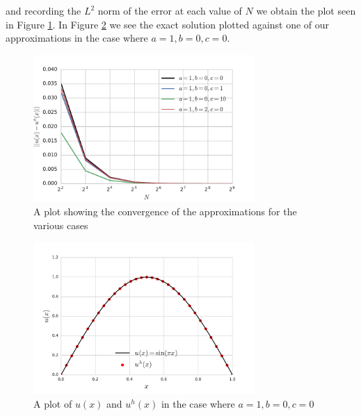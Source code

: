 and recording the $L^2$ norm of the error at each value of $N$ we obtain the
plot seen in Figure \ref{fig:oned-deterministic-error}. In Figure
\ref{fig:oned-deterministic-exact-v-approx} we see the exact solution plotted
against one of our approximations in the case where $a = 1, b = 0, c = 0$.

\begin{figure}
    \centering
    \includegraphics[width=0.75\textwidth]{img/one-d-deterministic-error.pdf}
    \caption{A plot showing the convergence of the approximations for the
             various cases}
    \label{fig:oned-deterministic-error}
\end{figure}

\begin{figure}
    \centering
    \includegraphics[width=0.75\textwidth]{img/oned-deterministic-plot.pdf}
    \caption{A plot of $u(x)$ and $u^h(x)$ in the case where $a=1, b=0, c=0$}
    \label{fig:oned-deterministic-exact-v-approx}
\end{figure}
